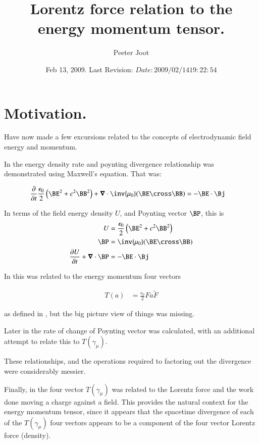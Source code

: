 \documentclass{article}
\title{ Lorentz force relation to the energy momentum tensor. }
\author{Peeter Joot}
\date{ Feb 13, 2009.  Last Revision: $Date: 2009/02/14 19:22:54 $ }
\begin{document}
\maketitle{}

\tableofcontents

\section{ Motivation. }

Have now made a few excursions related to the concepts of electrodynamic
field energy and momentum.

In \cite{PJpoynting} the energy density rate and poynting divergence 
relationship was demonstrated using Maxwell's equation.  That was:

\begin{align}
\PD{t}{}\frac{\epsilon_0}{2} \left(\BE^2 + c^2 \BB^2\right) + \spacegrad \cdot \inv{\mu_0}(\BE \cross \BB) &= -\BE \cdot \Bj 
\end{align}

In terms of the field energy density $U$, and Poynting vector $\BP$, this is
\begin{align}
U &= \frac{\epsilon_0}{2} \left(\BE^2 + c^2 \BB^2\right) \\
\BP &= \inv{\mu_0}(\BE \cross \BB) \\
\PD{t}{U} + \spacegrad \cdot \BP &= -\BE \cdot \Bj 
\end{align}

In \cite{PJemstresstensor} this was related to the 
energy momentum four vectors

\begin{align}
T(a) &= \frac{\epsilon_0}{2} F a \tilde{F}
\end{align}

as defined
in \cite{doran2003gap}, but the big picture view 
of things was missing.

Later in \cite{PJpoyntingRate} the rate of change of Poynting vector
was calculated, with an additional attempt to relate this to $T(\gamma_\mu)$.

These relationships, and the operations required to factoring out the divergence were considerably messier.

Finally, in \cite{PJelectricFieldEnergy} the four vector $T(\gamma_\mu)$
was related to the Lorentz force and the work done moving a charge against
a field.  This provides the natural context for the energy momentum tensor, 
since it appears that the spacetime divergence of each of the
$T(\gamma_\mu)$ four vectors appears to be a component of the
four vector Lorentz force (density).  
\end{document}
